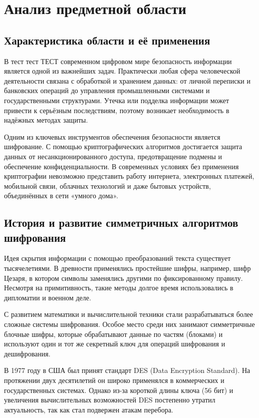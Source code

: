 \section{Анализ предметной области}
\subsection{Характеристика области и её применения}

В тест тест 	ТЕСТ современном цифровом мире безопасность информации является одной из важнейших задач. Практически любая сфера человеческой деятельности связана с обработкой и хранением данных: от личной переписки и банковских операций до управления промышленными системами и государственными структурами. Утечка или подделка информации может привести к серьёзным последствиям, поэтому возникает необходимость в надёжных методах защиты.  

Одним из ключевых инструментов обеспечения безопасности является шифрование. С помощью криптографических алгоритмов достигается защита данных от несанкционированного доступа, предотвращение подмены и обеспечение конфиденциальности. В современных условиях без применения криптографии невозможно представить работу интернета, электронных платежей, мобильной связи, облачных технологий и даже бытовых устройств, объединённых в сети «умного дома».  

\subsection{История и развитие симметричных алгоритмов шифрования}

Идея скрытия информации с помощью преобразований текста существует тысячелетиями. В древности применялись простейшие шифры, например, шифр Цезаря, в котором символы заменялись другими по фиксированному правилу. Несмотря на примитивность, такие методы долгое время использовались в дипломатии и военном деле.  

С развитием математики и вычислительной техники стали разрабатываться более сложные системы шифрования. Особое место среди них занимают симметричные блочные шифры, которые обрабатывают данные по частям (блоками) и используют один и тот же секретный ключ для операций шифрования и дешифрования.  

В 1977 году в США был принят стандарт DES (Data Encryption Standard). На протяжении двух десятилетий он широко применялся в коммерческих и государственных системах. Однако из-за короткой длины ключа (56 бит) и увеличения вычислительных возможностей DES постепенно утратил актуальность, так как стал подвержен атакам перебора.  


